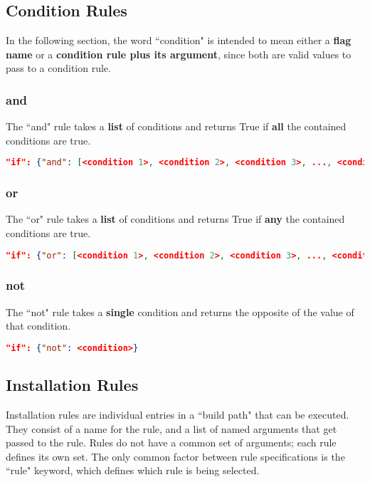\documentclass{article}
\begin{document}
\subsection{Condition Rules}\label{section:conditionrules}
In the following section, the word ``condition" is intended to mean either a \textbf{flag name} or a \textbf{condition rule plus its argument}, since both are valid values to pass to a condition rule.
\subsubsection{and}
The ``and" rule takes a \textbf{list} of conditions and returns True if \textbf{all} the contained conditions are true.
\begin{lstlisting}[language=json,firstnumber=1]
"if": {"and": [<condition 1>, <condition 2>, <condition 3>, ..., <condition N>]}
\end{lstlisting}
\subsubsection{or}
The ``or" rule takes a \textbf{list} of conditions and returns True if \textbf{any} the contained conditions are true.
\begin{lstlisting}[language=json,firstnumber=1]
"if": {"or": [<condition 1>, <condition 2>, <condition 3>, ..., <condition N>]}
\end{lstlisting}
\subsubsection{not}
The ``not" rule takes a \textbf{single} condition and returns the opposite of the value of that condition.
\begin{lstlisting}[language=json,firstnumber=1]
"if": {"not": <condition>}
\end{lstlisting}
\newpage
\subsection{Installation Rules}\label{section:installationrules}
Installation rules are individual entries in a ``build path" that can be executed. They consist of a name for the rule, and a list of named arguments that get passed to the rule. Rules do not have a common set of arguments; each rule defines its own set. The only common factor between rule specifications is the ``rule" keyword, which defines which rule is being selected.
\end{document}

